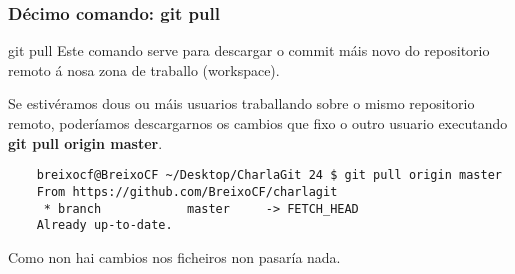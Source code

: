 \begin{frame}[fragile]
  \frametitle{Décimo comando: git pull}
  \begin{block}{git pull}
    Este comando serve para descargar o commit máis novo do repositorio remoto á nosa zona de traballo (workspace).
  \end{block}
  \scriptsize
  Se estivéramos dous ou máis usuarios traballando sobre o mismo repositorio remoto, poderíamos descargarnos os cambios que fixo o outro usuario executando \textbf{git pull origin master}.
  \tiny 
\begin{verbatim}
	breixocf@BreixoCF ~/Desktop/CharlaGit 24 $ git pull origin master 
	From https://github.com/BreixoCF/charlagit
	 * branch            master     -> FETCH_HEAD
	Already up-to-date.
\end{verbatim}
  Como non hai cambios nos ficheiros non pasaría nada.
\end{frame}


